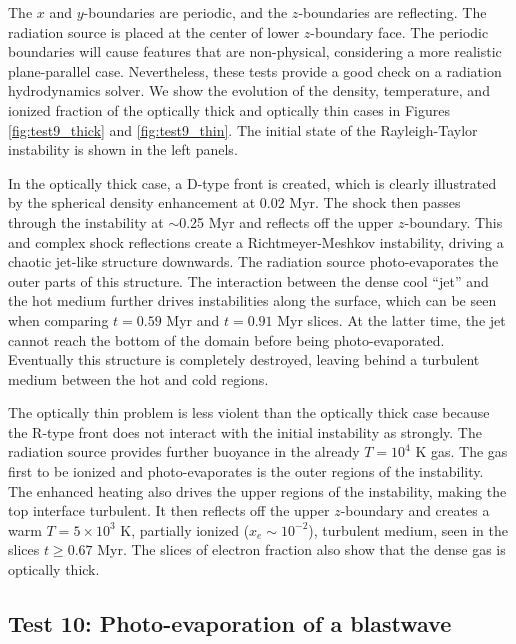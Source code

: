 \documentclass[12pt,preprint]{aastex}
\begin{document}
The $x$ and $y$-boundaries are periodic, and the $z$-boundaries are
reflecting.  The radiation source is placed at the center of lower
$z$-boundary face.  The periodic boundaries will cause features that
are non-physical, considering a more realistic plane-parallel case.
Nevertheless, these tests provide a good check on a radiation
hydrodynamics solver.  We show the evolution of the density,
temperature, and ionized fraction of the optically thick and optically
thin cases in Figures \ref{fig:test9_thick} and \ref{fig:test9_thin}.
The initial state of the Rayleigh-Taylor instability is shown in the
left panels.

In the optically thick case, a D-type front is created, which is
clearly illustrated by the spherical density enhancement at 0.02 Myr.
The shock then passes through the instability at $\sim$0.25 Myr and
reflects off the upper $z$-boundary.  This and complex shock
reflections create a Richtmeyer-Meshkov instability, driving a chaotic
jet-like structure downwards.  The radiation source photo-evaporates
the outer parts of this structure.  The interaction between the dense
cool ``jet'' and the hot medium further drives instabilities along the
surface, which can be seen when comparing $t = 0.59$ Myr and $t =
0.91$ Myr slices.  At the latter time, the jet cannot reach the bottom
of the domain before being photo-evaporated.  Eventually this
structure is completely destroyed, leaving behind a turbulent medium
between the hot and cold regions.

The optically thin problem is less violent than the optically thick
case because the R-type front does not interact with the initial
instability as strongly.  The radiation source provides further
buoyance in the already $T=10^4$ K gas.  The gas first to be ionized
and photo-evaporates is the outer regions of the instability.  The
enhanced heating also drives the upper regions of the instability,
making the top interface turbulent.  It then reflects off the upper
$z$-boundary and creates a warm $T = 5 \times 10^3$ K, partially
ionized ($x_e \sim 10^{-2}$), turbulent medium, seen in the slices $t
\ge 0.67$ Myr.  The slices of electron fraction also show that the
dense gas is optically thick.

\subsection{Test 10: Photo-evaporation of a blastwave}
\end{document}
